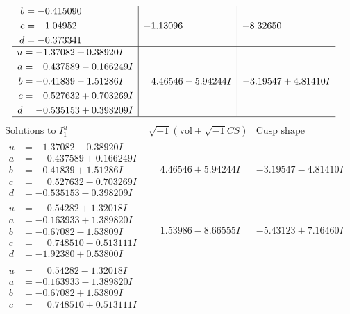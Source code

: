 \documentclass[1p]{elsarticle_modified}
\theoremstyle{definition}
\newcommand{\I}{\sqrt{-1}}
\begin{document}
$$\begin{array}{c|c|c}
\begin{aligned}
b &= -0.415090\phantom{ +0.000000I} \\
c &= \phantom{-}1.04952\phantom{ +0.000000I} \\
d &= -0.373341\phantom{ +0.000000I}\end{aligned}
 & -1.13096\phantom{ +0.000000I} & -8.32650\phantom{ +0.000000I} \\ \hline\begin{aligned}
u &= -1.37082 + 0.38920 I \\
a &= \phantom{-}0.437589 - 0.166249 I \\
b &= -0.41839 - 1.51286 I \\
c &= \phantom{-}0.527632 + 0.703269 I \\
d &= -0.535153 + 0.398209 I\end{aligned}
 & \phantom{-}4.46546 - 5.94244 I & -3.19547 + 4.81410 I\\
 \hline 
 \end{array}$$\newpage$$\begin{array}{c|c|c}  
\text{Solutions to }I^u_{1}& \I (\text{vol} + \sqrt{-1}CS) & \text{Cusp shape}\\
 \hline 
\begin{aligned}
u &= -1.37082 - 0.38920 I \\
a &= \phantom{-}0.437589 + 0.166249 I \\
b &= -0.41839 + 1.51286 I \\
c &= \phantom{-}0.527632 - 0.703269 I \\
d &= -0.535153 - 0.398209 I\end{aligned}
 & \phantom{-}4.46546 + 5.94244 I & -3.19547 - 4.81410 I \\ \hline\begin{aligned}
u &= \phantom{-}0.54282 + 1.32018 I \\
a &= -0.163933 + 1.389820 I \\
b &= -0.67082 - 1.53809 I \\
c &= \phantom{-}0.748510 - 0.513111 I \\
d &= -1.92380 + 0.53800 I\end{aligned}
 & \phantom{-}1.53986 - 8.66555 I & -5.43123 + 7.16460 I \\ \hline\begin{aligned}
u &= \phantom{-}0.54282 - 1.32018 I \\
a &= -0.163933 - 1.389820 I \\
b &= -0.67082 + 1.53809 I \\
c &= \phantom{-}0.748510 + 0.513111 I \\

\end{aligned}
\end{array}$$
\end{document}
